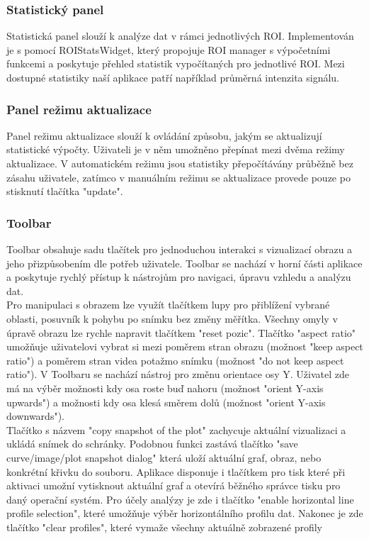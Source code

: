 \documentclass{article}
\begin{document}
\subsubsection{Statistický panel}
Statistická panel slouží k analýze dat v rámci jednotlivých ROI. Implementován je s pomocí ROIStatsWidget, který propojuje ROI manager s výpočetními funkcemi a poskytuje přehled statistik vypočítaných pro jednotlivé ROI. Mezi dostupné statistiky naší aplikace patří například průměrná intenzita signálu.

\subsubsection{Panel režimu aktualizace}
Panel režimu aktualizace slouží k ovládání způsobu, jakým se aktualizují statistické výpočty. Uživateli je v něm umožněno přepínat mezi dvěma režimy aktualizace. V automatickém režimu jsou statistiky přepočítávány průběžně bez zásahu uživatele, zatímco v manuálním režimu se aktualizace provede pouze po stisknutí tlačítka "update".

\subsubsection{Toolbar}
Toolbar obsahuje sadu tlačítek pro jednoduchou interakci s vizualizací obrazu a jeho přizpůsobením dle potřeb uživatele. Toolbar se nachází v horní části aplikace a poskytuje rychlý přístup k nástrojům pro navigaci, úpravu vzhledu a analýzu dat.\\

Pro manipulaci s obrazem lze využít tlačítkem lupy pro přiblížení vybrané oblasti, posuvník k pohybu po snímku bez změny měřítka. Všechny omyly v úpravě obrazu lze rychle napravit tlačítkem "reset pozic". Tlačítko "aspect ratio" umožňuje uživatelovi vybrat si mezi poměrem stran obrazu (možnost "keep aspect  ratio") a poměrem stran videa potažmo snímku (možnost "do not keep aspect ratio"). V Toolbaru se nachází nástroj pro změnu orientace osy Y. Uživatel zde má na výběr možnosti kdy osa roste buď nahoru (možnost "orient Y-axis upwards") a možnosti kdy osa klesá směrem dolů (možnost "orient Y-axis downwards").\\

Tlačítko s názvem "copy snapshot of the plot" zachycuje aktuální vizualizaci a ukládá snímek do schránky. Podobnou funkci zastává tlačítko "save curve/image/plot snapshot dialog" která uloží aktuální graf, obraz, nebo konkrétní křivku do souboru. Aplikace disponuje i tlačítkem pro tisk které při aktivaci umožní vytisknout aktuální graf a otevírá běžného správce tisku pro daný operační systém. Pro účely analýzy je zde i tlačítko "enable horizontal line profile selection", které umožňuje výběr horizontálního profilu dat. Nakonec je zde tlačítko "clear profiles", které vymaže všechny aktuálně zobrazené profily
\end{document}
